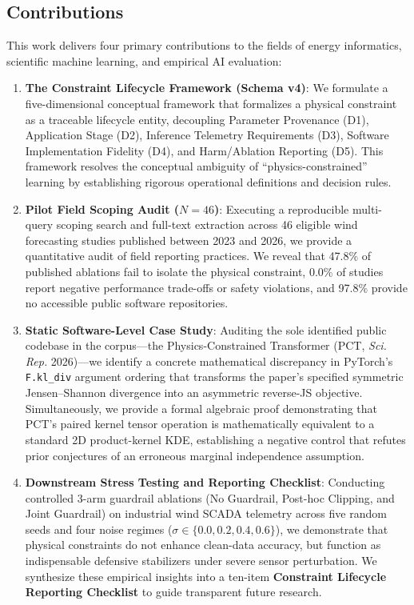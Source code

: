 \documentclass[preprint,3p,times]{elsarticle}
\begin{document}
\subsection{Contributions}
This work delivers four primary contributions to the fields of energy informatics, scientific machine learning, and empirical AI evaluation:
\begin{enumerate}
    \item \textbf{The Constraint Lifecycle Framework (Schema v4)}: We formulate a five-dimensional conceptual framework that formalizes a physical constraint as a traceable lifecycle entity, decoupling Parameter Provenance (D1), Application Stage (D2), Inference Telemetry Requirements (D3), Software Implementation Fidelity (D4), and Harm/Ablation Reporting (D5). This framework resolves the conceptual ambiguity of ``physics-constrained'' learning by establishing rigorous operational definitions and decision rules.
    \item \textbf{Pilot Field Scoping Audit ($N=46$)}: Executing a reproducible multi-query scoping search and full-text extraction across 46 eligible wind forecasting studies published between 2023 and 2026, we provide a quantitative audit of field reporting practices. We reveal that 47.8\% of published ablations fail to isolate the physical constraint, 0.0\% of studies report negative performance trade-offs or safety violations, and 97.8\% provide no accessible public software repositories.
    \item \textbf{Static Software-Level Case Study}: Auditing the sole identified public codebase in the corpus---the Physics-Constrained Transformer (PCT, \textit{Sci. Rep.} 2026)---we identify a concrete mathematical discrepancy in PyTorch's \texttt{F.kl\_div} argument ordering that transforms the paper's specified symmetric Jensen--Shannon divergence into an asymmetric reverse-JS objective. Simultaneously, we provide a formal algebraic proof demonstrating that PCT's paired kernel tensor operation is mathematically equivalent to a standard 2D product-kernel KDE, establishing a negative control that refutes prior conjectures of an erroneous marginal independence assumption.
    \item \textbf{Downstream Stress Testing and Reporting Checklist}: Conducting controlled 3-arm guardrail ablations (No Guardrail, Post-hoc Clipping, and Joint Guardrail) on industrial wind SCADA telemetry across five random seeds and four noise regimes ($\sigma \in \{0.0, 0.2, 0.4, 0.6\}$), we demonstrate that physical constraints do not enhance clean-data accuracy, but function as indispensable defensive stabilizers under severe sensor perturbation. We synthesize these empirical insights into a ten-item \textbf{Constraint Lifecycle Reporting Checklist} to guide transparent future research.
\end{enumerate}
\end{document}
